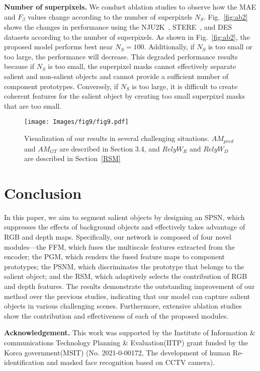 \documentclass[runningheads]{llncs}
\begin{document}
	\noindent
	\textbf{Number of superpixels.} We conduct ablation studies to observe how the MAE and $F_{\beta}$ values change according to the number of superpixels $N_S$. Fig.~\ref{fig:ab2} shows the changes in performance using the NJU2K~\cite{ju2014depth}, STERE~\cite{niu2012leveraging}, and DES~\cite{cheng2014depth} datasets according to the number of superpixels. As shown in Fig.~\ref{fig:ab2}, the proposed model performs best near $N_S = 100$. Additionally, if $N_S$ is too small or too large, the performance will decrease. This degraded performance results because if $N_S$ is too small, the superpixel masks cannot effectively separate salient and non-salient objects and cannot provide a sufficient number of component prototypes. Conversely, if $N_S$ is too large, it is difficult to create coherent features for the salient object by creating too small superpixel masks that are too small.
	
	\begin{figure}[t]
		\texttt{[image: Images/fig9/fig9.pdf]}
		\caption{Visualization of our results in several challenging situations. $AM_{pred}$ and $AM_{GT}$ are described in Section 3.4, and $RelyW_{R}$ and $RelyW_{D}$ are described in Section~\ref{RSM}}
		\label{fig9}
	\end{figure} 
	
	\section{Conclusion}
	In this paper, we aim to segment salient objects by designing an SPSN, which suppresses the effects of background objects and effectively takes advantage of RGB and depth maps. Specifically, our network is composed of four novel modules—the FFM, which fuses the multiscale features extracted from the encoder; the PGM, which renders the fused feature maps to component prototypes; the PSNM, which discriminates the prototype that belongs to the salient object; and the RSM, which adaptively selects the contribution of RGB and depth features. The results demonstrate the outstanding improvement of our method over the previous studies, indicating that our model can capture salient objects in various challenging scenes. Furthermore, extensive ablation studies show the contribution and effectiveness of each of the proposed modules.
	
	\vfill
	\noindent\footnotesize\textbf{Acknowledgement.} This work was supported by the Institute of Information \& communications Technology Planning \& Evaluation(IITP) grant funded by the Korea government(MSIT) (No. 2021-0-00172, The development of human Re-identification and masked face recognition based on CCTV camera).
	\pagebreak
	
	\clearpage
\normalsize
	
	
\end{document}
